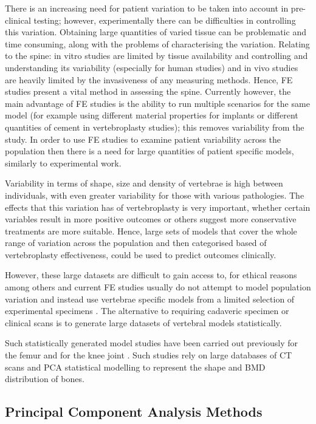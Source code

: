 There is an increasing need for patient variation to be taken into
account in pre-clinical testing; however, experimentally there can be
difficulties in controlling this variation. Obtaining large quantities
of varied tissue can be problematic and time consuming, along with the
problems of characterising the variation. Relating to the spine: in
vitro studies are limited by tissue availability and controlling and
understanding its variability (especially for human studies) and in vivo
studies are heavily limited by the invasiveness of any measuring
methods. Hence, FE studies present a vital method in assessing the
spine. Currently however, the main advantage of FE studies is the
ability to run multiple scenarios for the same model (for example using different material properties for implants or different quantities of cement in vertebroplasty studies); this removes variability from the study. In
order to use FE studies to examine patient variability across the
population then there is a need for large quantities of patient specific
models, similarly to experimental work.

Variability in terms of shape, size and density of vertebrae is high
between individuals, with even greater variability for those with
various pathologies. The effects that this variation has of
vertebroplasty is very important, whether certain variables result in
more positive outcomes or others suggest more conservative treatments
are more suitable. Hence, large sets of models that cover the whole
range of variation across the population and then categorised based of
vertebroplasty effectiveness, could be used to predict outcomes
clinically.

However, these large datasets are difficult to gain access to,
for ethical reasons among others \cite{Grassi2014} and current FE studies
usually
do not attempt to model population variation and instead use vertebrae
specific models from a limited selection of experimental specimens
\cite{Buckley2006, Kinzl2012, Wijayathunga2008, Chevalier2008}. The
alternative to
requiring
cadaveric specimen or clinical scans is to generate large datasets of
vertebral models statistically.

Such statistically generated model studies have been carried out
previously for the femur \cite{Grassi2014, Vaananen2015} and for the
knee joint
\cite{Rao2013, Fitzpatrick2011}. Such studies rely on large databases of
CT scans and
PCA statistical modelling to represent the shape and BMD distribution of bones.

\subsection{Principal Component Analysis Methods}\label{pca-methods}

